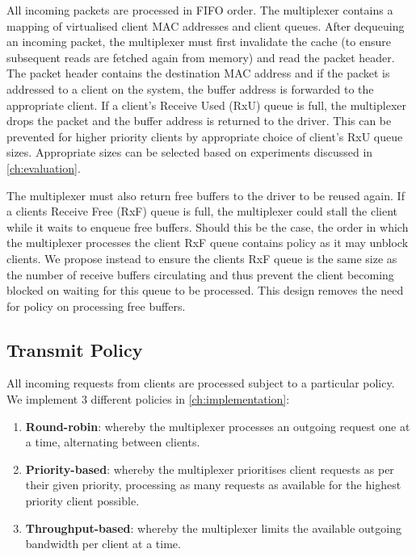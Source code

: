 All incoming packets are processed in FIFO order. The multiplexer contains a 
mapping of virtualised client MAC addresses and client queues. After dequeuing an incoming packet,
the multiplexer must first invalidate the cache (to ensure subsequent reads are fetched again from memory)
and read the packet header. The packet header contains the destination MAC address and if the packet is
addressed to a client on the system, the buffer address is forwarded to the appropriate client. 
If a client's Receive Used (RxU) queue is full, the multiplexer drops the packet and the buffer address is returned to
the driver. This can be prevented for higher priority clients by appropriate choice of client's RxU queue
sizes. Appropriate sizes can be selected based on experiments discussed in \autoref{ch:evaluation}.

The multiplexer must also return free buffers to the driver to be reused again. If a clients Receive Free
(RxF) queue is full, the multiplexer could stall the client while it waits to enqueue free buffers. Should this be the case,
the order in which the multiplexer processes the client RxF queue contains policy as it may
unblock clients. We propose instead to ensure the clients RxF queue is the same size as the number
of receive buffers circulating and thus prevent the client becoming blocked on waiting for this queue to be
processed. This design removes the need for policy on processing free buffers. \\ 

\subsection{Transmit Policy}

All incoming requests from clients are processed subject to a particular policy. 
We implement 3 different policies in \autoref{ch:implementation}:
\begin{enumerate}
    \item \textbf{Round-robin}: whereby the multiplexer processes an outgoing request one at a time, alternating between clients.
    \item \textbf{Priority-based}: whereby the multiplexer prioritises client requests as per their given priority, processing as many
    requests as available for the highest priority client possible. 
    \item \textbf{Throughput-based}: whereby the multiplexer limits the available outgoing bandwidth per client at a time.
\end{enumerate}


